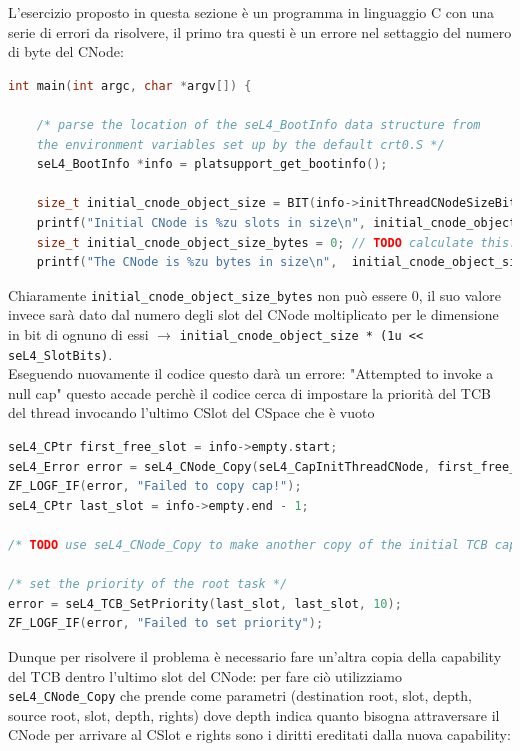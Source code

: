 L'esercizio proposto in questa sezione è un programma in linguaggio C con una serie di errori da risolvere, il primo tra questi è un errore nel settaggio del numero di byte del CNode:
\begin{lstlisting}[language=C++]
int main(int argc, char *argv[]) {

    /* parse the location of the seL4_BootInfo data structure from
    the environment variables set up by the default crt0.S */
    seL4_BootInfo *info = platsupport_get_bootinfo();

    size_t initial_cnode_object_size = BIT(info->initThreadCNodeSizeBits);
    printf("Initial CNode is %zu slots in size\n", initial_cnode_object_size);
    size_t initial_cnode_object_size_bytes = 0; // TODO calculate this.
    printf("The CNode is %zu bytes in size\n", 	initial_cnode_object_size_bytes);
\end{lstlisting}
Chiaramente \texttt{initial\_cnode\_object\_size\_bytes} non può essere 0, il suo valore invece sarà dato dal numero degli slot del CNode moltiplicato per le dimensione in bit di ognuno di essi $\rightarrow$ \texttt{initial\_cnode\_object\_size * (1u << seL4\_SlotBits)}.\\
Eseguendo nuovamente il codice questo darà un errore: "Attempted to invoke a null cap" questo accade perchè il codice cerca di impostare la priorità del TCB del thread invocando l'ultimo CSlot del CSpace che è vuoto
\begin{lstlisting}[language=C++]
seL4_CPtr first_free_slot = info->empty.start;
seL4_Error error = seL4_CNode_Copy(seL4_CapInitThreadCNode, first_free_slot, seL4_WordBits, seL4_CapInitThreadCNode, seL4_CapInitThreadTCB, seL4_WordBits, seL4_AllRights);
ZF_LOGF_IF(error, "Failed to copy cap!");
seL4_CPtr last_slot = info->empty.end - 1;
    
/* TODO use seL4_CNode_Copy to make another copy of the initial TCB capability to the last slot in the CSpace */

/* set the priority of the root task */
error = seL4_TCB_SetPriority(last_slot, last_slot, 10);
ZF_LOGF_IF(error, "Failed to set priority");
\end{lstlisting}
Dunque per risolvere il problema è necessario fare un'altra copia della capability del TCB dentro l'ultimo slot del CNode: per fare ciò utilizziamo \texttt{seL4\_CNode\_Copy} che prende come parametri (destination root, slot, depth, source root, slot, depth, rights) dove depth indica quanto bisogna attraversare il CNode per arrivare al CSlot e rights sono i diritti ereditati dalla nuova capability:
